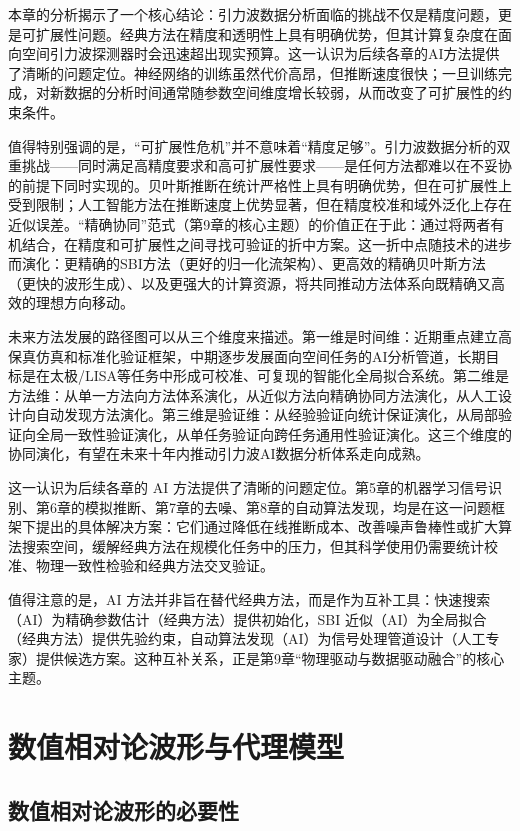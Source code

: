 本章的分析揭示了一个核心结论：引力波数据分析面临的挑战不仅是精度问题，更是可扩展性问题。经典方法在精度和透明性上具有明确优势，但其计算复杂度在面向空间引力波探测器时会迅速超出现实预算。这一认识为后续各章的AI方法提供了清晰的问题定位。神经网络的训练虽然代价高昂，但推断速度很快；一旦训练完成，对新数据的分析时间通常随参数空间维度增长较弱，从而改变了可扩展性的约束条件。

值得特别强调的是，“可扩展性危机”并不意味着“精度足够”。引力波数据分析的双重挑战——同时满足高精度要求和高可扩展性要求——是任何方法都难以在不妥协的前提下同时实现的。贝叶斯推断在统计严格性上具有明确优势，但在可扩展性上受到限制；人工智能方法在推断速度上优势显著，但在精度校准和域外泛化上存在近似误差。“精确协同”范式（第9章的核心主题）的价值正在于此：通过将两者有机结合，在精度和可扩展性之间寻找可验证的折中方案。这一折中点随技术的进步而演化：更精确的SBI方法（更好的归一化流架构）、更高效的精确贝叶斯方法（更快的波形生成）、以及更强大的计算资源，将共同推动方法体系向既精确又高效的理想方向移动。

未来方法发展的路径图可以从三个维度来描述。第一维是时间维：近期重点建立高保真仿真和标准化验证框架，中期逐步发展面向空间任务的AI分析管道，长期目标是在太极/LISA等任务中形成可校准、可复现的智能化全局拟合系统。第二维是方法维：从单一方法向方法体系演化，从近似方法向精确协同方法演化，从人工设计向自动发现方法演化。第三维是验证维：从经验验证向统计保证演化，从局部验证向全局一致性验证演化，从单任务验证向跨任务通用性验证演化。这三个维度的协同演化，有望在未来十年内推动引力波AI数据分析体系走向成熟。

这一认识为后续各章的 AI 方法提供了清晰的问题定位。第5章的机器学习信号识别、第6章的模拟推断、第7章的去噪、第8章的自动算法发现，均是在这一问题框架下提出的具体解决方案：它们通过降低在线推断成本、改善噪声鲁棒性或扩大算法搜索空间，缓解经典方法在规模化任务中的压力，但其科学使用仍需要统计校准、物理一致性检验和经典方法交叉验证。

值得注意的是，AI 方法并非旨在替代经典方法，而是作为互补工具：快速搜索（AI）为精确参数估计（经典方法）提供初始化，SBI 近似（AI）为全局拟合（经典方法）提供先验约束，自动算法发现（AI）为信号处理管道设计（人工专家）提供候选方案。这种互补关系，正是第9章“物理驱动与数据驱动融合”的核心主题。

\section{数值相对论波形与代理模型}

\subsection{数值相对论波形的必要性}

